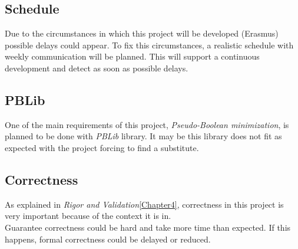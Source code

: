 \subsection{Schedule}
Due to the circumstances in which this project will be developed (Erasmus) possible delays could appear. To fix this circumstances, a realistic schedule with weekly communication will be planned. This will support a continuous development and detect as soon as possible delays. 

\subsection{PBLib}
One of the main requirements of this project, \emph{Pseudo-Boolean minimization}, is planned to be done with \emph{PBLib} library. It may be this library does not fit as expected with the project forcing to find a substitute. 

\subsection{Correctness}
As explained in \emph{Rigor and Validation}\ref{Chapter4}, correctness in this project is very important because of the context it is in. \\
Guarantee correctness could be hard and take more time than expected. If this happens, formal correctness could be delayed or reduced. 
